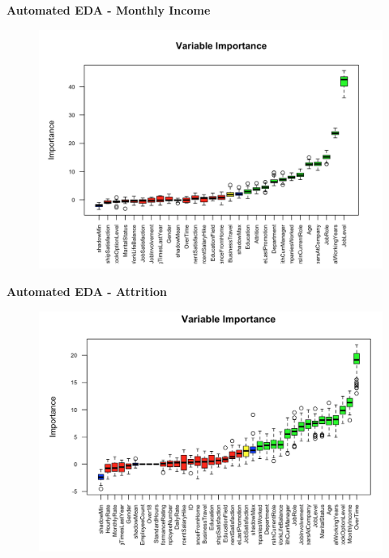 \documentclass[notes,11pt]{beamer}
\begin{document}


\begin{frame}
\begin{center}
\textbf{\color{blue}\Large{Automated EDA - Monthly Income}}
\end{center}\medskip
\begin{figure}
\includegraphics[scale=0.40]{PIC9}
\end{figure}


\end{frame}



\begin{frame}
\begin{center}
\textbf{\color{blue}\Large{Automated EDA - Attrition}}
\end{center}\medskip
\begin{figure}
\includegraphics[scale=0.40]{PIC10}
\end{figure}


\end{frame}
\end{document}
